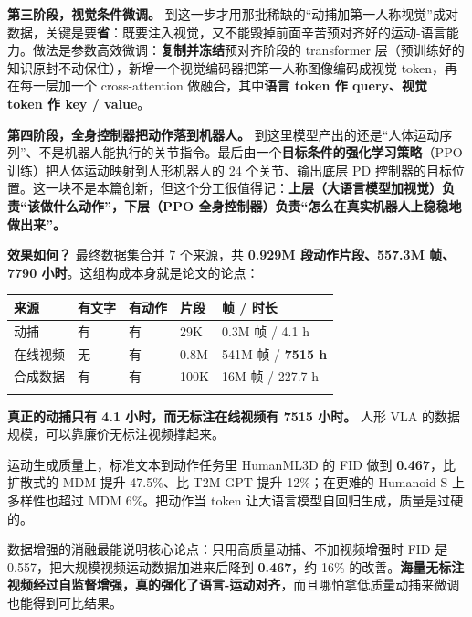 \documentclass[
  chinese,
]{ctexart}
\begin{document}
\textbf{第三阶段，视觉条件微调。}
到这一步才用那批稀缺的``动捕加第一人称视觉''成对数据，关键是要\textbf{省}：既要注入视觉，又不能毁掉前面辛苦预对齐好的运动-语言能力。做法是参数高效微调：\textbf{复制并冻结}预对齐阶段的
transformer
层（预训练好的知识原封不动保住），新增一个视觉编码器把第一人称图像编码成视觉
token，再在每一层加一个 cross-attention 做融合，其中\textbf{语言 token
作 query、视觉 token 作 key / value}。

\textbf{第四阶段，全身控制器把动作落到机器人。}
到这里模型产出的还是``人体运动序列''、不是机器人能执行的关节指令。最后由一个\textbf{目标条件的强化学习策略}（PPO
训练）把人体运动映射到人形机器人的 24 个关节、输出底层 PD
控制器的目标位置。这一块不是本篇创新，但这个分工很值得记：\textbf{上层（大语言模型加视觉）负责``该做什么动作''，下层（PPO
全身控制器）负责``怎么在真实机器人上稳稳地做出来''。}

\textbf{效果如何？} 最终数据集合并 7 个来源，共 \textbf{0.929M
段动作片段、557.3M 帧、7790 小时}。这组构成本身就是论文的论点：

\begin{center}
\begin{tabular}{@{}>{\raggedright\arraybackslash}p{} >{\raggedright\arraybackslash}p{} >{\raggedright\arraybackslash}p{} >{\raggedright\arraybackslash}p{} >{\raggedright\arraybackslash}p{}@{}}
\toprule\noalign{}
来源 & 有文字 & 有动作 & 片段 & 帧 / 时长 \\
\midrule\noalign{}
动捕 & 有 & 有 & 29K & 0.3M 帧 / 4.1 h \\
在线视频 & 无 & 有 & 0.8M & 541M 帧 / \textbf{7515 h} \\
合成数据 & 有 & 有 & 100K & 16M 帧 / 227.7 h \\
\bottomrule\noalign{}
\end{tabular}
\end{center}

\textbf{真正的动捕只有 4.1 小时，而无标注在线视频有 7515 小时。} 人形
VLA 的数据规模，可以靠廉价无标注视频撑起来。

运动生成质量上，标准文本到动作任务里 HumanML3D 的 FID 做到
\textbf{0.467}，比扩散式的 MDM 提升 47.5\%、比 T2M-GPT 提升
12\%；在更难的 Humanoid-S 上多样性也超过 MDM 6\%。把动作当 token
让大语言模型自回归生成，质量是过硬的。

数据增强的消融最能说明核心论点：只用高质量动捕、不加视频增强时 FID 是
0.557，把大规模视频运动数据加进来后降到 \textbf{0.467}，约 16\%
的改善。\textbf{海量无标注视频经过自监督增强，真的强化了语言-运动对齐}，而且哪怕拿低质量动捕来微调也能得到可比结果。
\end{document}
